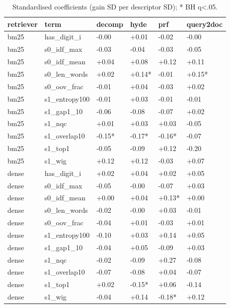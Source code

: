 \begin{table}
\caption{Standardised coefficients (gain SD per descriptor SD); * BH q<.05.}
\label{tab:b-reg}
\begin{tabular}{llllll}
\toprule
retriever & term & decomp & hyde & prf & query2doc \\
\midrule
bm25 & has\_digit\_i & -0.00 & +0.01 & -0.02 & -0.00 \\
bm25 & s0\_idf\_max & -0.03 & -0.04 & -0.03 & -0.05 \\
bm25 & s0\_idf\_mean & +0.04 & +0.08 & +0.12 & +0.11 \\
bm25 & s0\_len\_words & +0.02 & +0.14* & -0.01 & +0.15* \\
bm25 & s0\_oov\_frac & -0.01 & +0.04 & -0.03 & +0.02 \\
bm25 & s1\_entropy100 & -0.01 & +0.03 & -0.01 & -0.01 \\
bm25 & s1\_gap1\_10 & -0.06 & -0.08 & -0.07 & +0.02 \\
bm25 & s1\_nqc & +0.01 & +0.03 & +0.03 & -0.05 \\
bm25 & s1\_overlap10 & -0.15* & -0.17* & -0.16* & -0.07 \\
bm25 & s1\_top1 & -0.05 & -0.09 & +0.12 & -0.20 \\
bm25 & s1\_wig & +0.12 & +0.12 & -0.03 & +0.07 \\
dense & has\_digit\_i & +0.02 & +0.04 & +0.02 & +0.05 \\
dense & s0\_idf\_max & -0.05 & -0.00 & -0.07 & +0.03 \\
dense & s0\_idf\_mean & +0.00 & +0.04 & +0.13* & +0.00 \\
dense & s0\_len\_words & -0.02 & -0.00 & +0.03 & -0.01 \\
dense & s0\_oov\_frac & -0.04 & +0.01 & -0.03 & +0.01 \\
dense & s1\_entropy100 & -0.10 & +0.03 & +0.14 & +0.05 \\
dense & s1\_gap1\_10 & -0.04 & +0.05 & -0.09 & +0.03 \\
dense & s1\_nqc & -0.02 & -0.09 & +0.27 & -0.08 \\
dense & s1\_overlap10 & -0.07 & -0.08 & +0.04 & -0.07 \\
dense & s1\_top1 & +0.02 & -0.15* & +0.06 & -0.14 \\
dense & s1\_wig & -0.04 & +0.14 & -0.18* & +0.12 \\
\bottomrule
\end{tabular}
\end{table}

